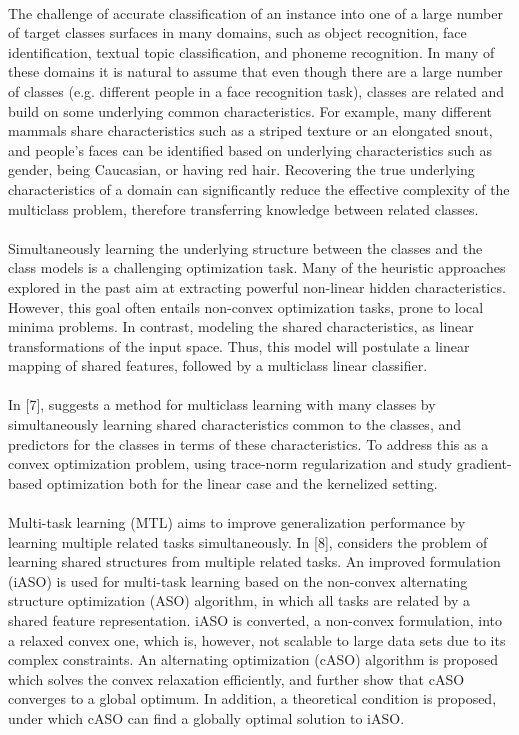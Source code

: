 \documentclass[a4paper,11pt]{report}
\begin{document}
\paragraph{}
The challenge of accurate classification of an instance into one of a large number of target classes surfaces in many domains, such as object recognition, face identification, textual topic classification, and phoneme recognition. In many of these domains it is natural to assume that even though there are a large number of classes (e.g. different people in a face recognition task), classes are related and build on some underlying common characteristics. For example, many different mammals share characteristics such as a striped texture or an elongated snout, and people’s faces can be identified based on underlying characteristics such as gender, being Caucasian, or having red hair. Recovering the true underlying characteristics of a domain can significantly reduce the effective complexity of the multiclass problem, therefore transferring knowledge between related classes.
\paragraph{}
Simultaneously learning the underlying structure between the classes and the class models is a challenging optimization task. Many of the heuristic approaches explored in the past aim at extracting powerful non-linear hidden characteristics. However, this goal often entails non-convex optimization tasks, prone to local minima problems. In contrast, modeling the shared characteristics, as linear transformations of the input space. Thus, this model will postulate a linear mapping of shared features, followed by a multiclass linear classifier.
\paragraph{}
In [7],  suggests a method for multiclass
learning with many classes by simultaneously
learning shared characteristics common to the
classes, and predictors for the classes in terms of
these characteristics. To address this as a convex optimization
problem, using trace-norm regularization
and study gradient-based optimization both
for the linear case and the kernelized setting.
\paragraph{}
Multi-task learning (MTL) aims to improve
generalization performance by learning multiple
related tasks simultaneously. In [8],  considers the problem of learning
shared structures from multiple related
tasks. An improved formulation
(iASO) is used for multi-task learning based on the
non-convex alternating structure optimization
(ASO) algorithm, in which all tasks are
related by a shared feature representation.
 iASO is converted, a non-convex formulation,
into a relaxed convex one, which is, however,
not scalable to large data sets due to its complex
constraints. An alternating
optimization (cASO) algorithm is proposed which solves
the convex relaxation efficiently, and further
show that cASO converges to a global optimum.
In addition,  a theoretical
condition is proposed, under which cASO can find a globally
optimal solution to iASO.
\end{document}
